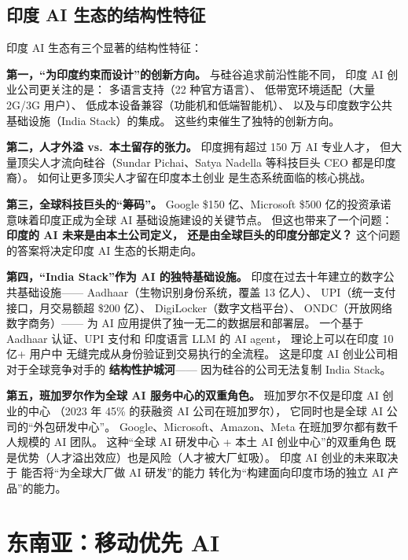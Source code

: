 \subsection{印度 AI 生态的结构性特征}

印度 AI 生态有三个显著的结构性特征：

\textbf{第一，``为印度约束而设计''的创新方向。}
与硅谷追求前沿性能不同，
印度 AI 创业公司更关注的是：
多语言支持（22 种官方语言）、
低带宽环境适配（大量 2G/3G 用户）、
低成本设备兼容（功能机和低端智能机）、
以及与印度数字公共基础设施（India Stack）的集成。
这些约束催生了独特的创新方向。

\textbf{第二，人才外溢 vs.\ 本土留存的张力。}
印度拥有超过 150 万 AI 专业人才，
但大量顶尖人才流向硅谷（Sundar Pichai、Satya Nadella
等科技巨头 CEO 都是印度裔）。
如何让更多顶尖人才留在印度本土创业
是生态系统面临的核心挑战。

\textbf{第三，全球科技巨头的``筹码''。}
Google \$150 亿、Microsoft \$500 亿的投资承诺
意味着印度正成为全球 AI 基础设施建设的关键节点。
但这也带来了一个问题：
\textbf{印度的 AI 未来是由本土公司定义，
还是由全球巨头的印度分部定义？}
这个问题的答案将决定印度 AI 生态的长期走向。

\textbf{第四，``India Stack''作为 AI 的独特基础设施。}
印度在过去十年建立的数字公共基础设施——
Aadhaar（生物识别身份系统，覆盖 13 亿人）、
UPI（统一支付接口，月交易额超 \$200 亿）、
DigiLocker（数字文档平台）、
ONDC（开放网络数字商务）——
为 AI 应用提供了独一无二的数据层和部署层。
一个基于 Aadhaar 认证、UPI 支付和
印度语言 LLM 的 AI agent，
理论上可以在印度 10 亿+ 用户中
无缝完成从身份验证到交易执行的全流程。
这是印度 AI 创业公司相对于全球竞争对手的
\textbf{结构性护城河}——
因为硅谷的公司无法复制 India Stack。

\textbf{第五，班加罗尔作为全球 AI 服务中心的双重角色。}
班加罗尔不仅是印度 AI 创业的中心
（2023 年 45\% 的获融资 AI 公司在班加罗尔），
它同时也是全球 AI 公司的``外包研发中心''。
Google、Microsoft、Amazon、Meta
在班加罗尔都有数千人规模的 AI 团队。
这种``全球 AI 研发中心 + 本土 AI 创业中心''的双重角色
既是优势（人才溢出效应）也是风险（人才被大厂虹吸）。
印度 AI 创业的未来取决于
能否将``为全球大厂做 AI 研发''的能力
转化为``构建面向印度市场的独立 AI 产品''的能力。

\section{东南亚：移动优先 AI}
\label{sec:global-sea}

